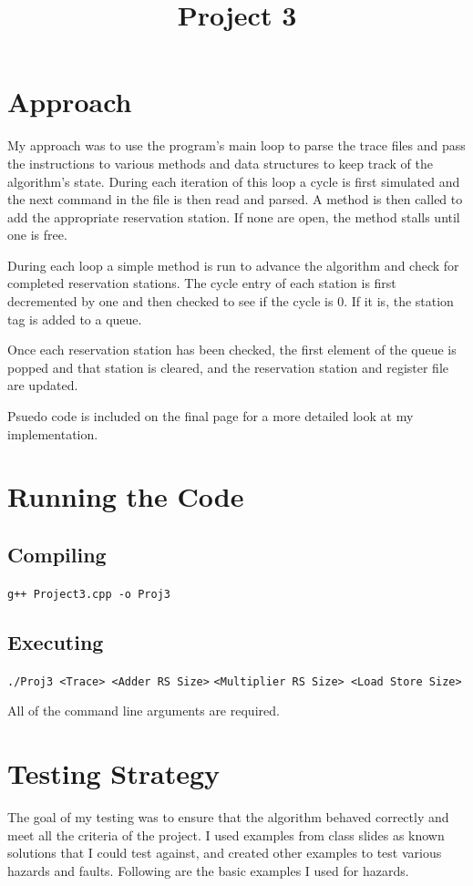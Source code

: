 \documentclass[twocolumn,letterpaper,10pt]{article}
\title{Project 3}
\begin{document}

\section{Approach}
My approach was to use the program's main loop to parse the trace files and pass the instructions to various methods and data structures to keep track of the algorithm's state. During each iteration of this loop a cycle is first simulated and the next command in the file is then read and parsed. A method is then called to add the appropriate reservation station. If none are open, the method stalls until one is free.

During each loop a simple method is run to advance the algorithm and check for completed reservation stations. The cycle entry of each station is first decremented by one and then checked to see if the cycle is 0. If it is, the station tag is added to a queue. 

Once each reservation station has been checked, the first element of the queue is popped and that station is cleared, and the reservation station and register file are updated.

Psuedo code is included on the final page for a more detailed look at my implementation.

\section{Running the Code}
\subsection{Compiling}
\verb~g++ Project3.cpp -o Proj3~
\subsection{Executing}
\verb~./Proj3 <Trace> <Adder RS Size>~ \verb~<Multiplier RS Size> <Load Store Size>~

\bigskip
All of the command line arguments are required.

\section{Testing Strategy}
The goal of my testing was to ensure that the algorithm behaved correctly and meet all the criteria of the project. I used examples from class slides as known solutions that I could test against, and created other examples to test various hazards and faults. Following are the basic examples I used for hazards.
\end{document}
